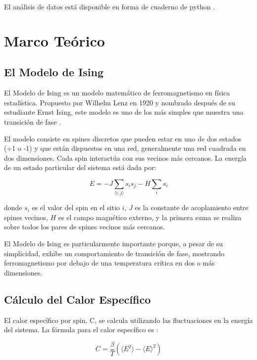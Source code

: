 \documentclass[twocolumn]{article}
\begin{document}
El análisis de datos está disponible en forma de cuaderno de python \cite{ising_notebook}.

\section{Marco Teórico}
\subsection*{El Modelo de Ising}

El Modelo de Ising es un modelo matemático de ferromagnetismo en física estadística. Propuesto por Wilhelm Lenz en 1920 y nombrado después de su estudiante Ernst Ising, este modelo es uno de los más simples que muestra una transición de fase \cite{isingwiki}.

El modelo consiste en spines discretos que pueden estar en uno de dos estados (+1 o -1) y que están dispuestos en una red, generalmente una red cuadrada en dos dimensiones. Cada spin interactúa con sus vecinos más cercanos. La energía de un estado particular del sistema está dada por:

\begin{equation}
    E = -J \sum_{\langle i,j \rangle} s_i s_j - H \sum_i s_i
\end{equation}

donde $s_i$ es el valor del spin en el sitio $i$, $J$ es la constante de acoplamiento entre spines vecinos, $H$ es el campo magnético externo, y la primera suma se realiza sobre todos los pares de spines vecinos más cercanos.

El Modelo de Ising es particularmente importante porque, a pesar de su simplicidad, exhibe un comportamiento de transición de fase, mostrando ferromagnetismo por debajo de una temperatura crítica en dos o más dimensiones.

\subsection*{Cálculo del Calor Específico}

El calor específico por spin, C, se calcula utilizando las fluctuaciones en la energía del sistema. La fórmula para el calor específico es \cite{chang_fisica_computacional}:

\begin{equation}
    C = \frac{\beta}{T} (\langle E^2 \rangle - \langle E \rangle^2)
\end{equation}
\end{document}
